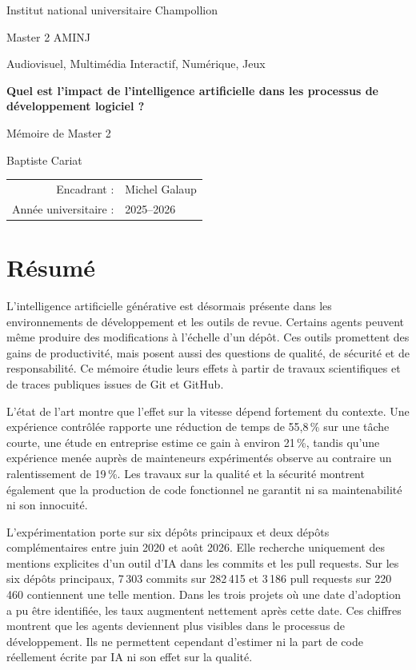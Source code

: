 \documentclass[12pt,a4paper,oneside]{report}
\newcommand{\taux}[1]{#1\,\%}
\begin{document}
\begin{titlepage}
  \centering
  {\large Institut national universitaire Champollion\par}
  \vspace{0.5cm}
  {\large Master 2 AMINJ\par}
  {\normalsize Audiovisuel, Multimédia Interactif, Numérique, Jeux\par}
  \vfill
  {\Huge\bfseries Quel est l'impact de l'intelligence artificielle dans les processus de développement logiciel ?\par}
  \vspace{1cm}
  {\Large Mémoire de Master 2\par}
  \vfill
  {\Large Baptiste Cariat\par}
  \vspace{1.5cm}
  \begin{tabular}{rl}
    Encadrant : & Michel Galaup \\
    Année universitaire : & 2025--2026
  \end{tabular}
  \vfill
\end{titlepage}


\chapter*{Résumé}
L'intelligence artificielle générative est désormais présente dans les environnements de développement et les outils de revue. Certains agents peuvent même produire des modifications à l'échelle d'un dépôt. Ces outils promettent des gains de productivité, mais posent aussi des questions de qualité, de sécurité et de responsabilité. Ce mémoire étudie leurs effets à partir de travaux scientifiques et de traces publiques issues de Git et GitHub.

L'état de l'art montre que l'effet sur la vitesse dépend fortement du contexte. Une expérience contrôlée rapporte une réduction de temps de \taux{55,8} sur une tâche courte, une étude en entreprise estime ce gain à environ \taux{21}, tandis qu'une expérience menée auprès de mainteneurs expérimentés observe au contraire un ralentissement de \taux{19}. Les travaux sur la qualité et la sécurité montrent également que la production de code fonctionnel ne garantit ni sa maintenabilité ni son innocuité.

L'expérimentation porte sur six dépôts principaux et deux dépôts complémentaires entre juin 2020 et août 2026. Elle recherche uniquement des mentions explicites d'un outil d'IA dans les commits et les pull requests. Sur les six dépôts principaux, 7\,303 commits sur 282\,415 et 3\,186 pull requests sur 220\,460 contiennent une telle mention. Dans les trois projets où une date d'adoption a pu être identifiée, les taux augmentent nettement après cette date. Ces chiffres montrent que les agents deviennent plus visibles dans le processus de développement. Ils ne permettent cependant d'estimer ni la part de code réellement écrite par IA ni son effet sur la qualité.
\end{document}
